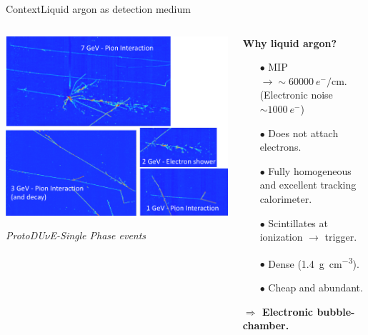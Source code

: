 \documentclass[10pt]{beamer}
\begin{document}
    \begin{frame}{Context}{Liquid argon as detection medium}
    	\begin{columns}
    		\begin{column}{0.6\textwidth}
    			\centering
    			\includegraphics[width=\textwidth]{figures/contexte/SP_evt.png}\\
    			\flushleft
    			\begin{footnotesize}\textit{ProtoDU$\nu$E-Single Phase events}\end{footnotesize}
    		\end{column}
    		\begin{column}{0.4\textwidth}
    			\begin{footnotesize}
    				\textbf{Why liquid argon?}
    			\end{footnotesize}
    			\begin{itemize}
    				\item[$\bullet$] MIP $\rightarrow\sim\SI{60000}{e^-\per\centi\meter}$. \\
    				(Electronic noise $\sim \SI{1000}{e^-}$)
    				\item[$\bullet$] Does not attach electrons.
    				\item[$\bullet$] Fully homogeneous and excellent tracking calorimeter.
    				\item[$\bullet$] Scintillates at ionization $\rightarrow$ trigger.
    				\item[$\bullet$] Dense (\SI{1.4}{\gram\per\centi\meter^3}).
    				\item[$\bullet$] Cheap and abundant.
    			\end{itemize}
    			\begin{footnotesize}
	    			\textbf{$\Rightarrow$ Electronic bubble-chamber.}
	    		\end{footnotesize}
    		\end{column}
    	\end{columns}
    \end{frame}
    
\end{document}
